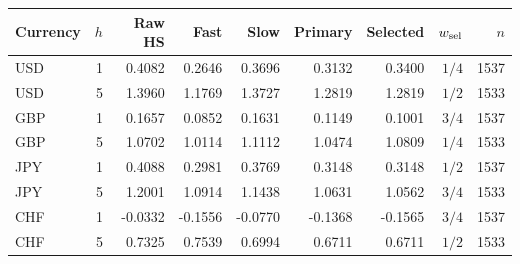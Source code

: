 \begin{tabular}{lrrrrrrrr}
\toprule
Currency & $h$ & Raw HS & Fast & Slow & Primary & Selected & $w_{\rm sel}$ & $n$ \\
\midrule
USD & 1 & 0.4082 & 0.2646 & 0.3696 & 0.3132 & 0.3400 & $1/4$ & 1537 \\
USD & 5 & 1.3960 & 1.1769 & 1.3727 & 1.2819 & 1.2819 & $1/2$ & 1533 \\
GBP & 1 & 0.1657 & 0.0852 & 0.1631 & 0.1149 & 0.1001 & $3/4$ & 1537 \\
GBP & 5 & 1.0702 & 1.0114 & 1.1112 & 1.0474 & 1.0809 & $1/4$ & 1533 \\
JPY & 1 & 0.4088 & 0.2981 & 0.3769 & 0.3148 & 0.3148 & $1/2$ & 1537 \\
JPY & 5 & 1.2001 & 1.0914 & 1.1438 & 1.0631 & 1.0562 & $3/4$ & 1533 \\
CHF & 1 & -0.0332 & -0.1556 & -0.0770 & -0.1368 & -0.1565 & $3/4$ & 1537 \\
CHF & 5 & 0.7325 & 0.7539 & 0.6994 & 0.6711 & 0.6711 & $1/2$ & 1533 \\
\bottomrule
\end{tabular}
